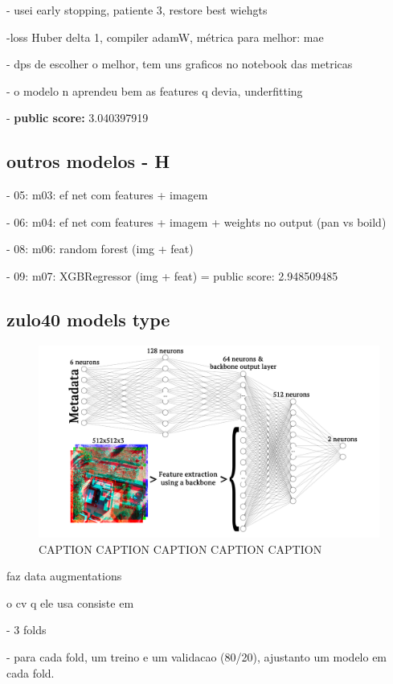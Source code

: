 \documentclass[conference]{IEEEtran}
\begin{document}
- usei early stopping, patiente 3, restore best wiehgts

-loss Huber delta 1, compiler adamW, métrica para melhor: mae

- dps de escolher o melhor, tem uns graficos no notebook das metricas

- o modelo n aprendeu bem as features q devia, underfitting

- \textbf{public score:} 3.040397919

\subsection{outros modelos - H}

- 05: m03: ef net com features + imagem

- 06: m04: ef net com features + imagem + weights no output (pan vs boild)

- 08: m06: random forest (img + feat)

- 09: m07: XGBRegressor (img + feat) = public score: 2.948509485

\subsection{zulo40 models type}


\begin{figure}[H]
    \centering
    \includegraphics[width=1\linewidth]{assets/nn.png}
    \caption{CAPTION CAPTION CAPTION CAPTION CAPTION}
    \label{fig:nn}
\end{figure}

faz data augmentations

o cv q ele usa consiste em

- 3 folds

- para cada fold, um treino e um validacao (80/20), ajustanto um modelo em cada fold.
\end{document}
